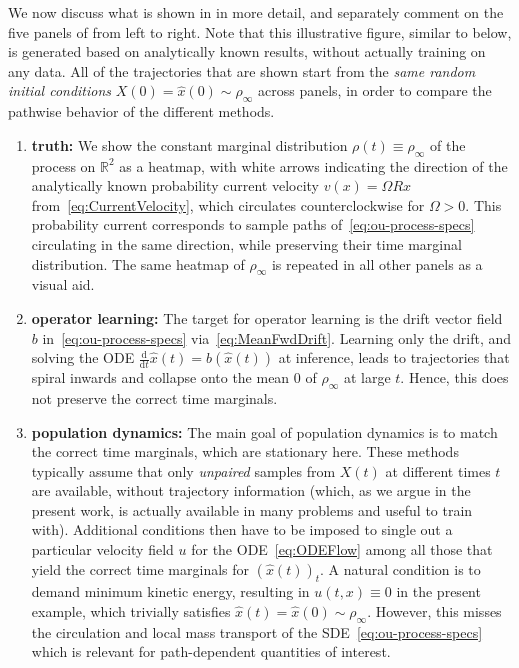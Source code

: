 \documentclass[oneside,11pt]{article}
\theoremstyle{remark}
\begin{document}
We now discuss what is shown in  in more detail, and separately comment on the five panels of  from left to right. Note that this illustrative figure, similar to  below, is generated based on analytically known results, without actually training on any data. All of the trajectories that are shown start from the \textit{same random initial conditions} $X(0) = \hat{x}(0) \sim \rho_\infty$ across panels, in order to compare the pathwise behavior of the different methods.
\begin{enumerate}
    \item \textbf{truth:} We show the constant marginal distribution $\rho(t) \equiv \rho_\infty$ of the process on $\mathbb{R}^2$ as a heatmap, with white arrows indicating the direction of the analytically known probability current velocity $v(x) = \Omega R x$ from~\eqref{eq:CurrentVelocity}, which circulates counterclockwise for $\Omega > 0$. 
This probability current corresponds to sample paths of~\eqref{eq:ou-process-specs} circulating in the same direction, while preserving their time marginal distribution. 
The same heatmap of $\rho_\infty$ is repeated in all other panels as a visual aid.
    \item \textbf{operator learning:} The target for operator learning is the drift vector field $b$ in~\eqref{eq:ou-process-specs} via~\eqref{eq:MeanFwdDrift}. 
Learning only the drift, and solving the ODE $\tfrac{\mathrm{d}}{\mathrm{d}t}\hat{x}(t) = b(\hat{x}(t))$ at inference, leads to trajectories that spiral inwards and collapse onto the mean $0$ of $\rho_\infty$ at large $t$. 
Hence, this does not preserve the correct time marginals.
    \item \textbf{population dynamics:}
    The main goal of population dynamics is to match the correct time marginals, which are stationary here. 
These methods typically assume that only \textit{unpaired} samples from $X(t)$ at different times $t$ are available, without trajectory information (which, as we argue in the present work, is actually available in many problems and useful to train with). Additional conditions then have to be imposed to single out a particular velocity field $u$ for the ODE~\eqref{eq:ODEFlow} among all those that yield the correct time marginals for $(\hat{x}(t))_t$. 
A natural condition is to demand minimum kinetic energy, resulting in $u(t,x) \equiv 0$ in the present example, which trivially satisfies $\hat{x}(t) = \hat{x}(0) \sim \rho_\infty$. However, this misses the circulation and local mass transport of the SDE~\eqref{eq:ou-process-specs} which is relevant for path-dependent quantities of interest.

\end{enumerate}
\end{document}
